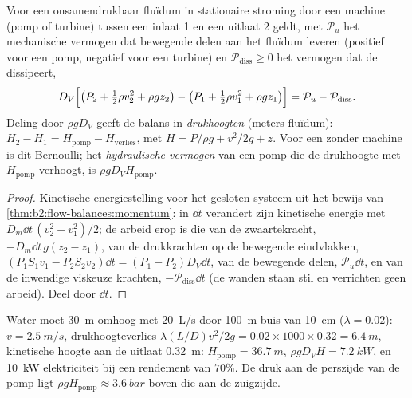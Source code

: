 \begin{theorem}\label{thm:b2:flow-balances:energy}
Voor een onsamendrukbaar fluïdum in stationaire stroming door een machine
(pomp of turbine) tussen een inlaat 1 en een uitlaat 2 geldt, met
$\mathcal P_u$ het mechanische vermogen dat bewegende delen aan het fluïdum
leveren (positief voor een pomp, negatief voor een turbine) en
$\mathcal P_{\text{diss}} \ge 0$ het vermogen dat de  dissipeert,
\[
D_V\Bigl[\bigl(P_2 + \tfrac12\rho v_2^2 + \rho gz_2\bigr) - \bigl(P_1 + \tfrac12\rho v_1^2
+ \rho gz_1\bigr)\Bigr] = \mathcal P_u - \mathcal P_{\text{diss}} .
\]
Deling door $\rho gD_V$ geeft de balans in \emph{drukhoogten} (meters
fluïdum): $H_2 - H_1 = H_{\text{pomp}} - H_{\text{verlies}}$, met
$H = P/\rho g +
v^2/2g + z$. Voor een  zonder machine is dit
Bernoulli; het \emph{hydraulische vermogen} van een pomp die de drukhoogte
met $H_{\text{pomp}}$ verhoogt, is $\rho gD_VH_{\text{pomp}}$.
\end{theorem}

\begin{proof}
Kinetische-energiestelling voor het gesloten systeem uit het bewijs van
\cref{thm:b2:flow-balances:momentum}: in $\dd t$ verandert zijn kinetische
energie met $D_m\dd t\,(v_2^2 - v_1^2)/2$; de arbeid erop is die van de
zwaartekracht, $-D_m\dd t\,g(z_2 - z_1)$, van de drukkrachten op de
bewegende eindvlakken, $(P_1S_1v_1 - P_2S_2v_2)\dd t = (P_1 - P_2)D_V\dd t$,
van de bewegende delen, $\mathcal P_u\dd t$, en van de inwendige viskeuze
krachten, $-\mathcal P_{\text{diss}}\dd t$ (de wanden staan stil en
verrichten geen arbeid). Deel door $\dd t$.
\end{proof}

\begin{example}\label{ex:b2:flow-balances:pump}
Water moet \qty{30}{m} omhoog met \qty{20}{L/s} door \qty{100}{m} buis van
\qty{10}{cm} ($\lambda = 0.02$): $v = \qty{2.5}{m/s}$, drukhoogteverlies
$\lambda(L/D)
v^2/2g = 0.02 \times 1000 \times 0.32 = \qty{6.4}{m}$,
kinetische hoogte aan de uitlaat \qty{0.32}{m}:
$H_{\text{pomp}} = \qty{36.7}{m}$, 
$\rho gD_VH =
\qty{7.2}{kW}$, en \qty{10}{kW} elektriciteit bij een
rendement van $70\%$. De druk aan de perszijde van de pomp ligt
$\rho gH_{\text{pomp}} \approx \qty{3.6}{bar}$ boven die aan de zuigzijde.
\end{example}

